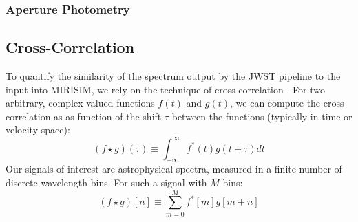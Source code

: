 \subsubsection{Aperture Photometry}
\subsection{Cross-Correlation}
\cite{Snellen2014}%
\cite{Simkin1974} %
\cite{Tonry1979} %
\cite{Petermann2019} %
\cite{Bodis2007} %
To quantify the similarity of the spectrum output by the JWST pipeline to the input into MIRISIM, we rely on the technique of cross correlation \cite{}.
For two arbitrary, complex-valued functions $f(t)$ and $g(t)$, we can compute the cross correlation as as function of the shift $\tau$ between the functions (typically in time or velocity space):
\begin{equation}\label{eqn:crosscorr}
\left(f \star g\right)(\tau) \equiv \int_{-\infty}^{\infty}f^{*}(t)g(t + \tau)dt
\end{equation}
Our signals of interest are astrophysical spectra, measured in a finite number of discrete wavelength bins. For such a signal with $M$ bins:
\begin{equation}\label{eqn:discretecorr}
\left(f \star g\right)[n] \equiv \sum_{m=0}^{M}f^{*}[m]g[m + n]
\end{equation}

